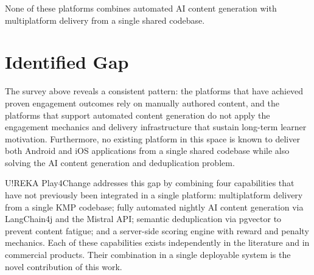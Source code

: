 None of these platforms combines automated AI content generation with multiplatform delivery from a single shared codebase.

\section{Identified Gap}
\label{sec:gap}

The survey above reveals a consistent pattern: the platforms that have achieved proven engagement outcomes rely on manually authored content, and the platforms that support automated content generation do not apply the engagement mechanics and delivery infrastructure that sustain long-term learner motivation. Furthermore, no existing platform in this space is known to deliver both Android and iOS applications from a single shared codebase while also solving the AI content generation and deduplication problem.

U!REKA Play4Change addresses this gap by combining four capabilities that have not previously been integrated in a single platform: multiplatform delivery from a single KMP codebase; fully automated nightly AI content generation via LangChain4j and the Mistral API; semantic deduplication via pgvector to prevent content fatigue; and a server-side scoring engine with reward and penalty mechanics. Each of these capabilities exists independently in the literature and in commercial products. Their combination in a single deployable system is the novel contribution of this work.
